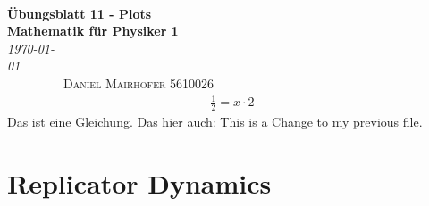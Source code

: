 \documentclass[10pt]{article}
\begin{document}
{\noindent\Huge\bf  \\[0.5\baselineskip] {\selectfont  Übungsblatt 11 - Plots}         }\\[2\baselineskip] %
{ {\bf {}\selectfont Mathematik für Physiker 1}\\ {\textit{\selectfont \today   }}}~~~~~~~~~~~~~~~~~~~~~~~~~~~~~~~~~~~~~~~~~~~~~~~~~~~~~~~~~~~~~~~~~~~~~~~~~~~~~\
{\textsc{Daniel Mairhofer 5610026}}%
\\[1.4\baselineskip] 
    
\begin{align}
                \frac 12 = x \cdot 2
\end{align}
Das ist eine Gleichung.
Das hier auch:
This is a Change to my previous file.
\section{Replicator Dynamics}
\end{document}
